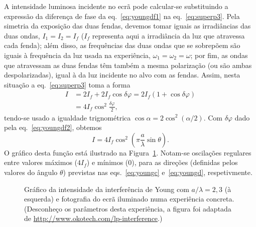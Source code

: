 A intensidade luminosa incidente no ecrã pode calcular-se substituindo a
expressão da diferença de fase da eq.~\eqref{eq:youngdf1} na
eq.~\eqref{eq:superp3}. Pela simetria da exposição das duas fendas, devemos
tomar iguais as irradiâncias das duas ondas, $I_1=I_2=I_f$ ($I_f$ representa
aqui a irradiância da luz que atravessa cada fenda); além disso, as frequências
das duas ondas que se sobrepõem são iguais à frequência da luz usada na
experiência, $\omega_1=\omega_2=\omega$; por fim, as ondas que atravessam as
duas fendas têm também a mesma polarização (ou são ambas despolarizadas), igual
à da luz incidente no alvo com as fendas. Assim, nesta situação a
eq.~\eqref{eq:superp3} toma a forma
\begin{align*}
I&=2I_f+2I_f\cos\delta\varphi=
  2I_f(1+\cos\delta\varphi)\\&=4I_f\cos^2\frac{\delta\varphi}{2},
\end{align*}
tendo-se usado a igualdade trignométrica $\cos\alpha=2\cos^2(\alpha/2)$. Com
$\delta\varphi$ dado pela eq.~\eqref{eq:youngdf2}, obtemos
\begin{equation}\label{eq:yngi}
I=4I_f\cos^2\left(\pi\frac{a}{\lambda}\sin\theta\right).
\end{equation}
O gráfico desta função está ilustrado na Figura~\ref{fig:yngint}. Notam-se
oscilações regulares entre valores máximos ($4I_f$) e mínimos (0), para as
direções (definidas pelos valores do ângulo $\theta$) previstas nas
eqs.~\eqref{eq:youngc} e~\eqref{eq:youngd}, respetivmente.
\begin{figure}[htb]
  {\centering
  \par}
  \caption{\label{fig:yngint}Gráfico da intensidade da interferência de Young
    com $a/\lambda=2,3$ (à esquerda) e fotografia do ecrã iluminado numa
    experiência concreta. (Desconheço os parâmetros desta experiência, a figura
    foi adaptada de \protect\url{http://www.okotech.com/lp-interference}.)}
\end{figure}
